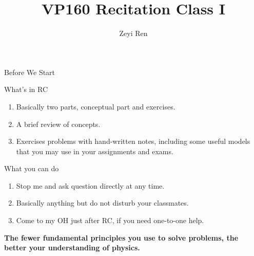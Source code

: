 \documentclass{beamer}
\title{VP160 Recitation Class I}
\author{Zeyi Ren}
\institute{UM-SJTU Joint Institute}
\begin{document}
\maketitle

\frame{\tableofcontents}

\begin{frame}{Before We Start}
  \begin{block}{What's in RC}
    \begin{enumerate}
      \item Basically two parts, conceptual part and exercises.
      \item A brief review of concepts.
      \item Exercises problems with hand-written notes, including some useful models that you may use in your assignments and exams.
    \end{enumerate}
  \end{block}
  \begin{block}{What you can do}
    \begin{enumerate}
      \item Stop me and ask question directly at any time.
      \item Basically anything but do not disturb your classmates.
      \item Come to my OH just after RC, if you need one-to-one help.
    \end{enumerate}
  \end{block}
  \textbf{The fewer fundamental principles you use to solve problems, the better your understanding of physics.}
\end{frame}
\end{document}
